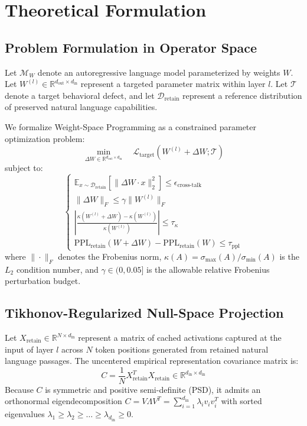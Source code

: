 \documentclass[11pt,a4paper]{article}
\begin{document}
\section{Theoretical Formulation}

\subsection{Problem Formulation in Operator Space}

Let $\mathcal{M}_W$ denote an autoregressive language model parameterized by weights $W$. Let $W^{(l)} \in \mathbb{R}^{d_{\text{out}} \times d_{\text{in}}}$ represent a targeted parameter matrix within layer $l$. Let $\mathcal{T}$ denote a target behavioral defect, and let $\mathcal{D}_{\text{retain}}$ represent a reference distribution of preserved natural language capabilities.

We formalize Weight-Space Programming as a constrained parameter optimization problem:
\begin{equation}
\min_{\Delta W \in \mathbb{R}^{d_{\text{out}} \times d_{\text{in}}}} \quad \mathcal{L}_{\text{target}}(W^{(l)} + \Delta W; \mathcal{T})
\end{equation}
subject to:
\begin{equation}
\begin{cases}
\mathbb{E}_{x \sim \mathcal{D}_{\text{retain}}} \left[ \|\Delta W \cdot x\|_2^2 \right] \le \epsilon_{\text{cross-talk}} \\
\|\Delta W\|_F \le \gamma \|W^{(l)}\|_F \\
\left| \frac{\kappa(W^{(l)} + \Delta W) - \kappa(W^{(l)})}{\kappa(W^{(l)})} \right| \le \tau_{\kappa} \\
\text{PPL}_{\text{retain}}(W + \Delta W) - \text{PPL}_{\text{retain}}(W) \le \tau_{\text{ppl}}
\end{cases}
\end{equation}
where $\|\cdot\|_F$ denotes the Frobenius norm, $\kappa(A) = \sigma_{\max}(A)/\sigma_{\min}(A)$ is the $L_2$ condition number, and $\gamma \in (0, 0.05]$ is the allowable relative Frobenius perturbation budget.

\subsection{Tikhonov-Regularized Null-Space Projection}

Let $X_{\text{retain}} \in \mathbb{R}^{N \times d_{\text{in}}}$ represent a matrix of cached activations captured at the input of layer $l$ across $N$ token positions generated from retained natural language passages. The uncentered empirical representation covariance matrix is:
\begin{equation}
C = \frac{1}{N} X_{\text{retain}}^T X_{\text{retain}} \in \mathbb{R}^{d_{\text{in}} \times d_{\text{in}}}
\end{equation}
Because $C$ is symmetric and positive semi-definite (PSD), it admits an orthonormal eigendecomposition $C = V \Lambda V^T = \sum_{i=1}^{d_{\text{in}}} \lambda_i v_i v_i^T$ with sorted eigenvalues $\lambda_1 \ge \lambda_2 \ge \dots \ge \lambda_{d_{\text{in}}} \ge 0$.
\end{document}
